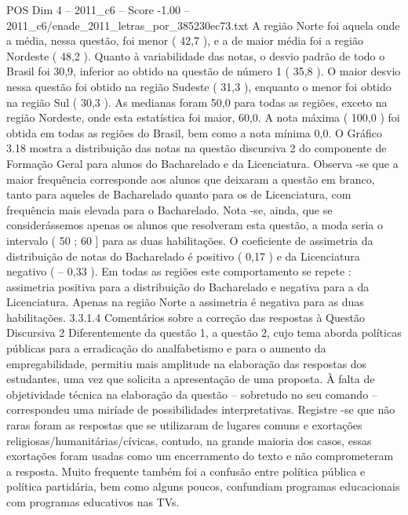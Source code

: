 \begin{textsample}{POS Dim 4 – 2011\_c6 – Score -1.00 – 2011\_c6/enade\_2011\_letras\_por\_385230ec73.txt}
A região Norte foi aquela onde a média, nessa questão, foi menor ( 42,7 ), e a de maior média foi a região Nordeste ( 48,2 ).
Quanto à variabilidade das notas, o desvio padrão de todo o Brasil foi 30,9, inferior ao obtido na questão de número 1 ( 35,8 ).
O maior desvio nessa questão foi obtido na região Sudeste ( 31,3 ), enquanto o menor foi obtido na região Sul ( 30,3 ).
As medianas foram 50,0 para todas as regiões, exceto na região Nordeste, onde esta estatística foi maior, 60,0.
A nota máxima ( 100,0 ) foi obtida em todas as regiões do Brasil, bem como a nota mínima 0,0.
O Gráfico 3.18 mostra a distribuição das notas na questão discursiva 2 do componente de Formação Geral para alunos do Bacharelado e da Licenciatura.
Observa -se que a maior frequência corresponde aos alunos que deixaram a questão em branco, tanto para aqueles de Bacharelado quanto para os de Licenciatura, com frequência mais elevada para o Bacharelado.
Nota -se, ainda, que se considerássemos apenas os alunos que resolveram esta questão, a moda seria o intervalo ( 50 ; 60 ] para as duas habilitações.
O coeficiente de assimetria da distribuição de notas do Bacharelado é positivo ( 0,17 ) e da Licenciatura negativo ( – 0,33 ).
Em todas as regiões este comportamento se repete : assimetria positiva para a distribuição do Bacharelado e negativa para a da Licenciatura.
Apenas na região Norte a assimetria é negativa para as duas habilitações. 3.3.1.4 Comentários sobre a correção das respostas à Questão Discursiva 2 Diferentemente da questão 1, a questão 2, cujo tema aborda políticas públicas para a erradicação do analfabetismo e para o aumento da empregabilidade, permitiu mais amplitude na elaboração das respostas dos estudantes, uma vez que solicita a apresentação de uma proposta.
À falta de objetividade técnica na elaboração da questão – sobretudo no seu comando – correspondeu uma miríade de possibilidades interpretativas.
Registre -se que não raras foram as respostas que se utilizaram de lugares comuns e exortações religiosas/humanitárias/cívicas, contudo, na grande maioria dos casos, essas exortações foram usadas como um encerramento do texto e não comprometeram a resposta.
Muito frequente também foi a confusão entre política pública e política partidária, bem como alguns poucos, confundiam programas educacionais com programas educativos nas TVs.

\end{textsample}
